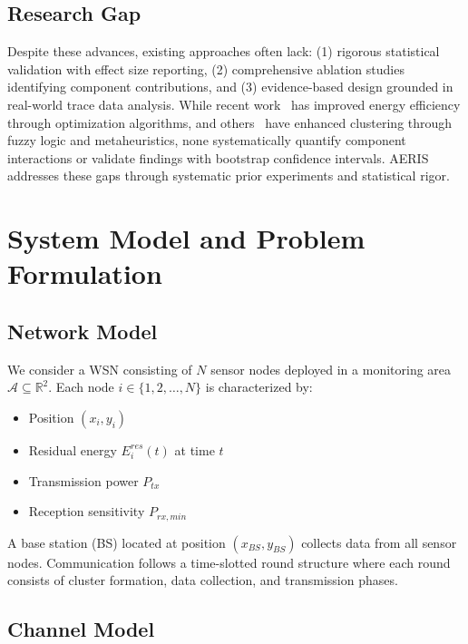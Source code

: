 \documentclass[sensors,article,submit,moreauthors,pdftex]{Definitions/mdpi}
\begin{document}
\subsection{Research Gap}

Despite these advances, existing approaches often lack: (1) rigorous statistical validation with effect size reporting, (2) comprehensive ablation studies identifying component contributions, and (3) evidence-based design grounded in real-world trace data analysis. While recent work~\cite{Wang2024EECR,Nayak2022Hybrid} has improved energy efficiency through optimization algorithms, and others~\cite{Patel2023Energy,Gupta2023Cluster} have enhanced clustering through fuzzy logic and metaheuristics, none systematically quantify component interactions or validate findings with bootstrap confidence intervals. AERIS addresses these gaps through systematic prior experiments and statistical rigor.

\section{System Model and Problem Formulation}\label{sec:system}

\subsection{Network Model}

We consider a WSN consisting of $N$ sensor nodes deployed in a monitoring area $\mathcal{A} \subseteq \mathbb{R}^2$. Each node $i \in \{1, 2, \ldots, N\}$ is characterized by:
\begin{itemize}
\item Position $(x_i, y_i)$
\item Residual energy $E_i^{res}(t)$ at time $t$
\item Transmission power $P_{tx}$
\item Reception sensitivity $P_{rx,min}$
\end{itemize}

A base station (BS) located at position $(x_{BS}, y_{BS})$ collects data from all sensor nodes. Communication follows a time-slotted round structure where each round consists of cluster formation, data collection, and transmission phases.

\subsection{Channel Model}
\end{document}
